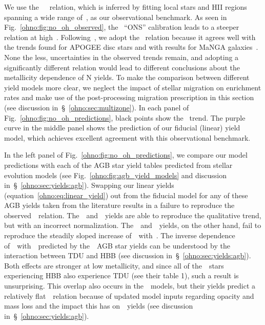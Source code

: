 We use the~\citet{Dopita2016}~\ohno~relation, which is inferred by fitting
local stars and HII regions spanning a wide range of~\oh, as our observational
benchmark.
As seen in Fig.~\ref{ohno:fig:no_oh_observed}, the~\citet{Pilyugin2010} ``ONS''
calibration leads to a steeper relation at high~\oh.
Following~\citet{Vincenzo2021b}, we adopt the~\citet{Dopita2016} relation
because it agrees well with the trends found for APOGEE disc stars and with
results for MaNGA galaxies~\citep[][see
Fig.~\ref{ohno:fig:no_oh_observed}]{Belfiore2017}.
None the less, uncertainties in the observed trends remain, and adopting a
significantly different relation would lead to different conclusions about the
metallicity dependence of N yields.
To make the comparison between different yield models more clear, we neglect
the impact of stellar migration on enrichment rates and make use of the
post-processing migration prescription in this section (see discussion
in~\S~\ref{ohno:sec:multizone}).
In each panel of Fig.~\ref{ohno:fig:no_oh_predictions}, black points show
the~\citet{Dopita2016} trend.
The purple curve in the middle panel shows the prediction of our fiducial
(linear) yield model, which achieves excellent agreement with this
observational benchmark.
\par
In the left panel of Fig.~\ref{ohno:fig:no_oh_predictions}, we compare our model
predictions with each of the AGB star yield tables predicted from stellar
evolution models (see Fig.~\ref{ohno:fig:agb_yield_models} and discussion
in~\S~\ref{ohno:sec:yields:agb}).
Swapping our linear yields (equation~\ref{ohno:eq:linear_yield}) out from the
fiducial model for any of these AGB yields taken from the literature results
in a failure to reproduce the observed~\ohno~relation.
The~\cristallo~and~\ventura~yields are able to reproduce the qualitative trend,
but with an incorrect normalization.
The~\karakasten~and~\karakas~yields, on the other hand, fail to reproduce
the steadily sloped increase of~\no~with~\oh.
The inverse dependence of~\no~with~\oh~predicted by the~\karakasten~AGB star
yields can be understood by the interaction between TDU and HBB (see discussion
in~\S~\ref{ohno:sec:yields:agb}).
Both effects are stronger at low metallicity, and since all of
the~\karakasten~stars experiencing HBB also experience TDU (see their table 1),
such a result is unsurprising.
This overlap also occurs in the~\karakas~models, but their yields predict a
relatively flat~\ohno~relation because of updated model inputs regarding
opacity and mass loss and the impact this has on~\Nfourteen~yields (see
discussion in~\S~\ref{ohno:sec:yields:agb}).

